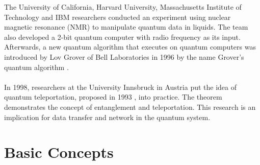 \documentclass[12pt]{third-rep}
\begin{document}
The University of California, Harvard University, Massachusetts Institute of Technology and IBM researchers conducted an experiment using nuclear magnetic resonance (NMR) to manipulate quantum data in liquids. The team also developed a 2-bit quantum computer with radio frequency as its input. Afterwards, a new quantum algorithm that executes on quantum computers was introduced by Lov Grover of Bell Laboratories in 1996 by the name Grover's quantum algorithm \cite{intro-qc}. \\\\
In 1998, researchers at the University Innsbruck in Austria put the idea of quantum teleportation, proposed in 1993 \cite{teleport}, into practice. The theorem demonstrates the concept of entanglement and teleportation. This research is an implication for data transfer and network in the quantum system.

\begingroup
\renewcommand{\cleardoublepage}{}
\renewcommand{\clearpage}{}
\chapter{Basic Concepts}
\endgroup
\end{document}
